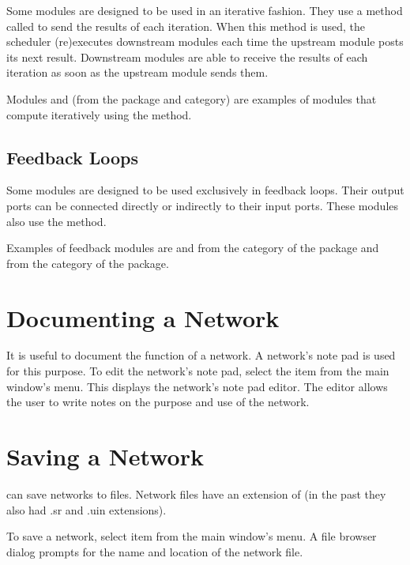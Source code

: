 Some modules are designed to be used in an iterative fashion. They use
a method called  to send the results of each
iteration.  When this method is used, the scheduler (re)executes
downstream modules each time the upstream module posts its next
result.  Downstream modules are able to receive the results of each
iteration as soon as the upstream module sends them.

Modules  and  (from the
\package{\sr} package and  category) are examples of modules
that compute iteratively using the  method.

\subsection{Feedback Loops}

Some modules are designed to be used exclusively in feedback
loops. Their output ports can be connected
directly or indirectly to their input ports.  These modules also use the
 method.

Examples of feedback modules are  and
 from the  category of the
 package and  from the
 category of the  package.

\section{Documenting a Network}
\label{sec:docnetwork}

It is useful to document the function of a network.  A network's note
pad is used for this purpose.  To edit the network's note pad,
select the  item from the main window's 
menu.  This displays the network's note pad editor.  The editor
allows the user to write notes on the purpose and use of the network.

\section{Saving a Network}
\label{sec:savenet}

\sr{} can save networks to files.  Network files have an extension of
 (in the past they also had .sr and .uin
extensions).  

To save a network, select  item from the main window's
 menu.  A file browser dialog prompts for the
name and location of the network file.

